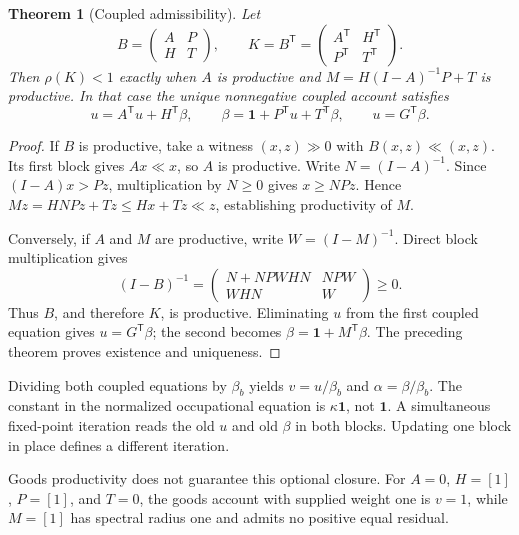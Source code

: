 \documentclass[11pt,a4paper]{article}
\newtheorem{theorem}{Theorem}[section]
\begin{document}
\begin{theorem}[Coupled admissibility]
Let
\begin{equation}
B=\begin{pmatrix}A&P\\H&T\end{pmatrix},\qquad
K=B^{\mathsf T}=\begin{pmatrix}A^{\mathsf T}&H^{\mathsf T}\\P^{\mathsf T}&T^{\mathsf T}\end{pmatrix}.
\end{equation}
Then $\rho(K)<1$ exactly when $A$ is productive and $M=H(I-A)^{-1}P+T$ is productive. In that case the unique nonnegative coupled account satisfies
\begin{equation}
u=A^{\mathsf T}u+H^{\mathsf T}\beta,\qquad
\beta=\mathbf1+P^{\mathsf T}u+T^{\mathsf T}\beta,
\qquad u=G^{\mathsf T}\beta.
\end{equation}
\end{theorem}
\begin{proof}
If $B$ is productive, take a witness $(x,z)\gg0$ with $B(x,z)\ll(x,z)$. Its first block gives $Ax\ll x$, so $A$ is productive. Write $N=(I-A)^{-1}$. Since $(I-A)x>Pz$, multiplication by $N\geq0$ gives $x\geq NPz$. Hence $Mz=HNPz+Tz\leq Hx+Tz\ll z$, establishing productivity of $M$.

Conversely, if $A$ and $M$ are productive, write $W=(I-M)^{-1}$. Direct block multiplication gives
\begin{equation}
(I-B)^{-1}=
\begin{pmatrix}
N+NPWHN&NPW\\WHN&W
\end{pmatrix}\geq0.
\end{equation}
Thus $B$, and therefore $K$, is productive. Eliminating $u$ from the first coupled equation gives $u=G^{\mathsf T}\beta$; the second becomes $\beta=\mathbf1+M^{\mathsf T}\beta$. The preceding theorem proves existence and uniqueness.
\end{proof}

Dividing both coupled equations by $\beta_b$ yields $v=u/\beta_b$ and $\alpha=\beta/\beta_b$. The constant in the normalized occupational equation is $\kappa\mathbf1$, not $\mathbf1$. A simultaneous fixed-point iteration reads the old $u$ and old $\beta$ in both blocks. Updating one block in place defines a different iteration.

Goods productivity does not guarantee this optional closure. For $A=0$, $H=[1]$, $P=[1]$, and $T=0$, the goods account with supplied weight one is $v=1$, while $M=[1]$ has spectral radius one and admits no positive equal residual.
\end{document}
